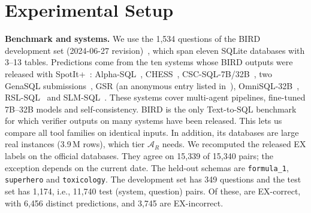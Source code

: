 \section{Experimental Setup}\label{sec:setup}

\textbf{Benchmark and systems.} We use the 1,534 questions of the BIRD development set (2024-06-27 revision)~\cite{li2023bird}, which span eleven SQLite databases with 3--13 tables. Predictions come from the ten systems whose BIRD outputs were released with SpotIt+~\cite{tremante2026spotitplus}: Alpha-SQL~\cite{li2025alphasql}, CHESS~\cite{talaei2024chess}, CSC-SQL-7B/32B~\cite{sheng2025cscsql}, two GenaSQL submissions~\cite{donder2025genasql}, GSR (an anonymous entry listed in~\cite{tremante2026spotitplus}), OmniSQL-32B~\cite{li2025omnisql}, RSL-SQL~\cite{cao2024rslsql} and SLM-SQL~\cite{sheng2025slmsql}. These systems cover multi-agent pipelines, fine-tuned 7B--32B models and self-consistency. BIRD is the only Text-to-SQL benchmark for which verifier outputs on many systems have been released. This lets us compare all tool families on identical inputs. In addition, its databases are large real instances (3.9\,M rows), which tier $\mathcal A_R$ needs. We recomputed the released EX labels on the official databases. They agree on 15,339 of 15,340 pairs; the exception depends on the current date. The held-out schemas are \texttt{formula\_1}, \texttt{superhero} and \texttt{toxicology}. The development set has 349 questions and the test set has 1,174, i.e., 11,740 test (system, question) pairs. Of these,  are EX-correct, with 6,456 distinct predictions, and 3,745 are EX-incorrect.

